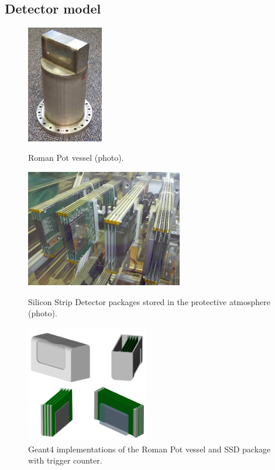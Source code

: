 \subsection{Detector model}
\begin{figure}[ht]
\centering
\parbox{0.2\textwidth}{
  \centering
  \includegraphics[height=145pt]{graphics/rpSim/romanpot.jpg}
  \caption[Roman Pot vessel (photo).]{Roman Pot vessel (photo).\newline}
  \label{fig:RPphoto}
}%
\quad%
\parbox{0.40\textwidth}{
  \centering
  \includegraphics[height=145pt]{graphics/rpSim/SSD.jpg}
  \caption[Silicon Strip Detector packages stored in the protective atmosphere (photo).]{Silicon Strip Detector packages stored in the protective atmosphere (photo).\newline}
  \label{fig:SSDphoto}
}%
\quad%
\parbox{0.33\textwidth}{
  \centering
  \includegraphics[height=145pt]{graphics/rpSim/g4Rp.png}
  \caption{Geant4 implementations of the Roman Pot vessel and SSD package with trigger counter.}
   \label{fig:g4Rp}
}
\end{figure}


